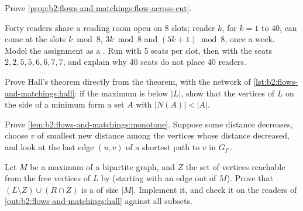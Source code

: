 \begin{exercise}[$\star\star$]\label{exo:b2:flows-and-matchings:8}
Prove \cref{prop:b2:flows-and-matchings:flow-across-cut}.
\end{exercise}

\begin{exercise}[$\star\star$]\label{exo:b2:flows-and-matchings:9}
Forty readers share a reading room open on 8 slots; reader $k$, for $k = 1$ to $40$, can come at the slots $k \bmod 8$, $3k \bmod 8$ and
$(5k + 1) \bmod 8$, once a week. Model the assignment as a . Run  with 5 seats per slot, then with
the seats $2, 2, 5, 5, 6, 6, 7, 7$, and explain why 40 seats do not place 40 readers.
\end{exercise}

\begin{exercise}[$\star\star\star$]\label{exo:b2:flows-and-matchings:10}
Prove Hall's theorem directly from the   theorem, with the network of \cref{lst:b2:flows-and-matchings:hall}:
if the maximum  is below $|L|$, show that the vertices of $L$ on the  side of a minimum  form a set $A$ with
$|N(A)| < |A|$.
\end{exercise}

\begin{exercise}[$\star\star\star$]\label{exo:b2:flows-and-matchings:11}
Prove \cref{lem:b2:flows-and-matchings:monotone}. Suppose some distance decreases, choose $v$ of smallest new distance
among the vertices whose distance decreased, and look at the last edge $(u, v)$ of a shortest path to $v$ in $G_{f'}$.
\end{exercise}

\begin{exercise}[$\star\star\star$]\label{exo:b2:flows-and-matchings:12}
Let $M$ be a maximum  of a bipartite graph, and $Z$ the set of vertices reachable from the free vertices of $L$
by  (starting with an edge out of $M$). Prove that $(L \setminus Z) \cup (R \cap Z)$ is a 
of size $|M|$. Implement it, and check it on the readers of \cref{out:b2:flows-and-matchings:hall} against all subsets.
\end{exercise}

